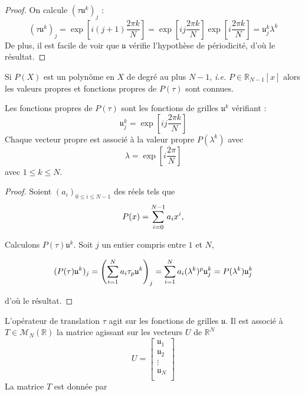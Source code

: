\begin{proof}
On calcule $(\tau \mathfrak{u}^k)_j$ :
\begin{equation}
(\tau \mathfrak{u}^k)_j = \exp \left[ i (j+1) \dfrac{2 \pi k}{N} \right] = \exp \left[ i j \dfrac{2 \pi k}{N} \right] \exp \left[ i \dfrac{2 \pi k}{N} \right]  = \mathfrak{u}_j^k \lambda^k
\end{equation}
De plus, il est facile de voir que $\mathfrak{u}$ vérifie l'hypothèse de périodicité, d'où le résultat.
\end{proof}
Si $P(X)$ est un polynôme en $X$ de degré au plus $N-1$, \textit{i.e.} $P \in \mathbb{R}_{N-1} [x]$ alors les valeurs propres et fonctions propres de $P(\tau)$ sont connues.

\begin{proposition}
Les fonctions propres de $P(\tau)$ sont les fonctions de grilles $\mathfrak{u}^k$ vérifiant :
\begin{equation}
\mathfrak{u}_j^k = \exp \left[ i j \dfrac{2 \pi k}{N} \right]
\end{equation}
Chaque vecteur propre est associé à la valeur propre $P(\lambda^k)$ avec 
\begin{equation}
\lambda = \exp \left[ i \dfrac{2 \pi}{N} \right]
\end{equation}
avec $1 \leq k \leq N$.
\label{prop:eigen_tau}
\end{proposition}

\begin{proof}
Soient $(a_i)_{0 \leq i \leq N-1}$ des réels tels que 
\begin{equation}
P(x) = \displaystyle\sum\limits_{i=0}^{N-1} a_i x^i,
\end{equation}

Calculons $P(\tau) \mathfrak{u}^k$. Soit $j$ un entier compris entre $1$ et $N$, 

\begin{equation}
(P(\tau) \mathfrak{u}^k)_j = \left( \displaystyle\sum\limits_{i=1}^{N} a_i \tau_ p \mathfrak{u}^k \right)_j = \displaystyle\sum\limits_{i=1}^{N} a_i (\lambda^k)^p \mathfrak{u}^k_j = P(\lambda^k) \mathfrak{u}^k_j
\end{equation}

d'où le résultat.
\end{proof}
L'opérateur de translation $\tau$ agit sur les fonctions de grilles $\mathfrak{u}$. Il est associé à $T \in \mathcal{M}_N \left( \mathbb{R} \right)$ la matrice agissant sur les vecteurs $U$ de $\mathbb{R}^N$
\begin{equation}
U = \begin{bmatrix}
\mathfrak{u}_1\\
\mathfrak{u}_2\\
\vdots\\
\mathfrak{u}_{N}\\
\end{bmatrix}
\end{equation}
La matrice $T$ est donnée par


